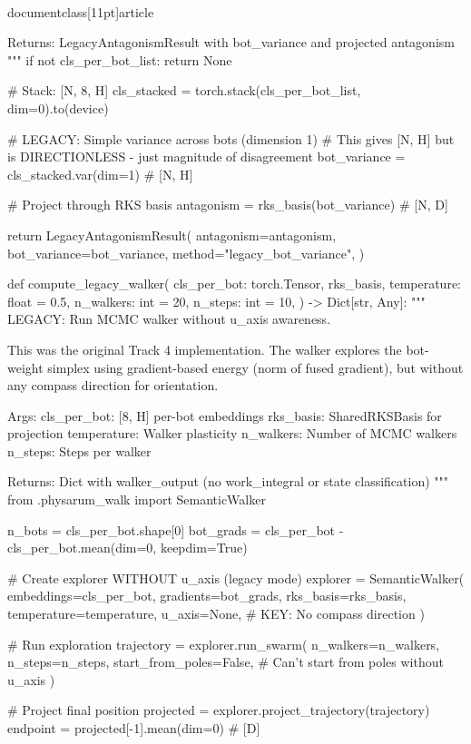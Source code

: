 \\documentclass[11pt]{article}
\begin{document}
\begin{CodeBlock}
    Returns:
        LegacyAntagonismResult with bot_variance and projected antagonism
    """
    if not cls_per_bot_list:
        return None

    # Stack: [N, 8, H]
    cls_stacked = torch.stack(cls_per_bot_list, dim=0).to(device)

    # LEGACY: Simple variance across bots (dimension 1)
    # This gives [N, H] but is DIRECTIONLESS - just magnitude of disagreement
    bot_variance = cls_stacked.var(dim=1)  # [N, H]

    # Project through RKS basis
    antagonism = rks_basis(bot_variance)  # [N, D]

    return LegacyAntagonismResult(
        antagonism=antagonism,
        bot_variance=bot_variance,
        method="legacy_bot_variance",
    )


def compute_legacy_walker(
    cls_per_bot: torch.Tensor,
    rks_basis,
    temperature: float = 0.5,
    n_walkers: int = 20,
    n_steps: int = 10,
) -> Dict[str, Any]:
    """
    LEGACY: Run MCMC walker without u_axis awareness.

    This was the original Track 4 implementation. The walker explores
    the bot-weight simplex using gradient-based energy (norm of fused gradient),
    but without any compass direction for orientation.

    Args:
        cls_per_bot: [8, H] per-bot embeddings
        rks_basis: SharedRKSBasis for projection
        temperature: Walker plasticity
        n_walkers: Number of MCMC walkers
        n_steps: Steps per walker

    Returns:
        Dict with walker_output (no work_integral or state classification)
    """
    from .physarum_walk import SemanticWalker

    n_bots = cls_per_bot.shape[0]
    bot_grads = cls_per_bot - cls_per_bot.mean(dim=0, keepdim=True)

    # Create explorer WITHOUT u_axis (legacy mode)
    explorer = SemanticWalker(
        embeddings=cls_per_bot,
        gradients=bot_grads,
        rks_basis=rks_basis,
        temperature=temperature,
        u_axis=None,  # KEY: No compass direction
    )

    # Run exploration
    trajectory = explorer.run_swarm(
        n_walkers=n_walkers,
        n_steps=n_steps,
        start_from_poles=False,  # Can't start from poles without u_axis
    )

    # Project final position
    projected = explorer.project_trajectory(trajectory)
    endpoint = projected[-1].mean(dim=0)  # [D]


\end{CodeBlock}
\end{document}
